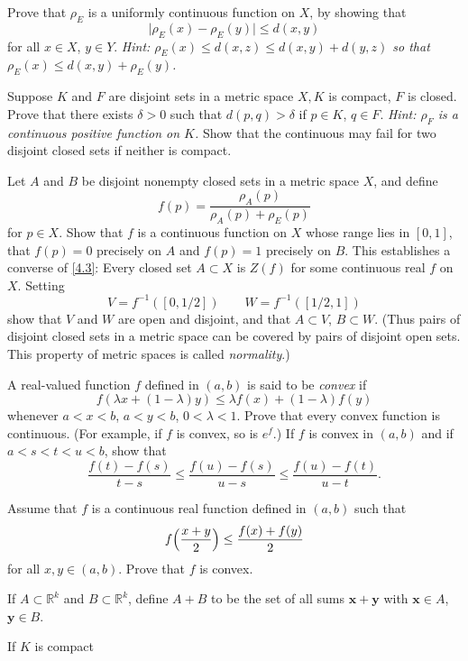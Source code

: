 \begin{exercise}
\begin{exercise}[label = (\alph*)]
  \item
    Prove that \(\rho_E\) is a uniformly continuous function on \(X\), by
    showing that
    \[
    \lvert\rho_E(x) - \rho_E(y)\rvert\leq d(x, y)
    \]
    for all \(x\in X\), \(y\in Y\).
    \textit{Hint: \(\rho_E(x)\leq d(x,z)\leq d(x,y) + d(y,z)\) so that
      \(\rho_E(x)\leq d(x,y) + \rho_E(y)\).}
  \end{exercise}
\item
  Suppose \(K\) and \(F\) are disjoint sets in a metric space \(X,K\) is
  compact, \(F\) is closed.
  Prove that there exists \(\delta > 0\) such that \(d(p,q) > \delta\) if
  \(p\in K\), \(q\in F\).
  \textit{Hint: \(\rho_F\) is a continuous positive function on \(K\).}
  Show that the continuous may fail for two disjoint closed sets if neither is
  compact.
\item
  Let \(A\) and \(B\) be disjoint nonempty closed sets in a metric space \(X\),
  and define
  \[
  f(p) = \frac{\rho_A(p)}{\rho_A(p) + \rho_E(p)}
  \]
  for \(p\in X\).
  Show that \(f\) is a continuous function on \(X\) whose range lies in
  \([0,1]\), that \(f(p) = 0\)  precisely on \(A\) and \(f(p) = 1\) precisely
  on \(B\).
  This establishes a converse of \cref{4.3}: Every closed set \(A\subset X\) is
  \(Z(f)\) for some continuous real \(f\) on \(X\).
  Setting
  \[
  V = f^{-1}([0, 1/2])\qquad W = f^{-1}([1/2, 1])
  \]
  show that \(V\) and \(W\) are open and disjoint, and that \(A\subset V\),
  \(B\subset W\).
  (Thus pairs of disjoint closed sets in a metric space can be covered by pairs
  of disjoint open sets.
  This property of metric spaces is called \textit{normality}.)
\item
  A real-valued function \(f\) defined in \((a,b)\) is said to be
  \textit{convex} if
  \[
  f(\lambda x + (1 - \lambda)y)\leq\lambda f(x) + (1 - \lambda)f(y)
  \]
  whenever \(a < x < b\), \(a < y < b\), \(0 < \lambda < 1\).
  Prove that every convex function is continuous.
  (For example, if \(f\) is convex, so is \(e^f\).)
  If \(f\) is convex in \((a,b)\) and if \(a < s < t < u < b\), show that
  \[
  \frac{f(t) - f(s)}{t - s}\leq\frac{f(u) - f(s)}{u - s}\leq
  \frac{f(u) - f(t)}{u - t}.
  \]
\item
  Assume that \(f\) is a continuous real function defined in \((a,b)\) such
  that
  \[
  f\Bigl(\frac{x + y}{2}\Bigr)\leq \frac{f(x) + f(y)}{2}
  \]
  for all \(x,y\in (a,b)\).
  Prove that \(f\) is convex.
\item
  If \(A\subset\mathbb{R}^k\) and \(B\subset\mathbb{R}^k\), define \(A + B\) to
  be the set of all sums \(\mathbold{x + y}\) with \(\mathbold{x}\in A\),
  \(\mathbold{y}\in B\).
  \begin{exercise}[label = (\alph*)]
  \item
    If \(K\) is compact
  \end{exercise}
\end{exercise}

